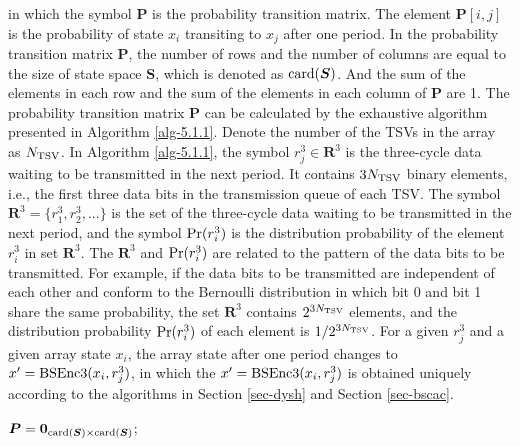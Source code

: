 \documentclass[lettersize,journal]{IEEEtran}
\begin{document}
\noindent in which the symbol $\boldsymbol{P}$ is the probability transition matrix. The element $\boldsymbol{P}[i,j]$ is the probability of state $x_i$ transiting to $x_j$ after one period. In the probability transition matrix $\boldsymbol{P}$, the number of rows and the number of columns are equal to the size of state space $\boldsymbol{S}$, which is denoted as ${\rm card}(\boldsymbol{S})$. And the sum of the elements in each row and the sum of the elements in each column of $\boldsymbol{P}$ are 1. The probability transition matrix $\boldsymbol{P}$ can be calculated by the exhaustive algorithm presented in Algorithm \ref{alg-5.1.1}. Denote the number of the TSVs in the array as $N_{\rm TSV}$. In Algorithm \ref{alg-5.1.1}, the symbol $r_j^3\in \boldsymbol{R}^3 $ is the three-cycle data waiting to be transmitted in the next period. It contains $3N_{\rm TSV}$ binary elements, i.e., the first three data bits in the transmission queue of each TSV. The symbol $\boldsymbol{R}^3=\{r_1^3,r_2^3,...\}$ is the set of the three-cycle data waiting to be transmitted in the next period, and the symbol ${\rm Pr}(r_i^3)$ is the distribution probability of the element $r_i^3$ in set $\boldsymbol{R}^3$. The $\boldsymbol{R}^3$ and ${\rm Pr}(r_i^3)$ are related to the pattern of the data bits to be transmitted. For example, if the data bits to be transmitted are independent of each other and conform to the Bernoulli distribution in which bit 0 and bit 1 share the same probability, the set $\boldsymbol{R}^3$ contains $2^{3N_{\rm TSV}}$ elements, and the distribution probability ${\rm Pr}(r_i^3)$ of each element is $1/2^{3N_{\rm TSV}}$. For a given $r_j^3$ and a given array state $x_i$, the array state after one period changes to $x'={\rm BSEnc3}(x_i,r_j^3)$, in which the $x'={\rm BSEnc3}(x_i,r_j^3)$ is obtained uniquely according to the algorithms in Section \ref{sec-dysh} and Section \ref{sec-bscac}.

\begin{algorithm}
	\caption{Computation of the probability transition matrix $\boldsymbol{P}$.}
	\label{alg-5.1.1}
	\DontPrintSemicolon
		$\boldsymbol{P} = \boldsymbol{0}_{{\rm card}(\boldsymbol{S})\times {\rm card}(\boldsymbol{S})}$;\\
				
\end{algorithm}
\end{document}
